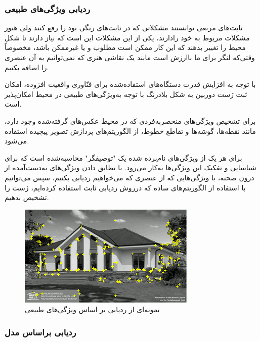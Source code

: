 	\subsubsection{ردیابی ویژگی‌های طبیعی}
	
	ثابت‌های مربعی توانستند مشکلاتی که در ثابت‌های رنگی بود را رفع کنند ولی هنوز مشکلات مربوط به خود رادارند، یکی از این مشکلات این است که نیاز دارند تا شکل محیط را تغییر بدهند که این کار ممکن است مطلوب و یا غیرممکن باشد، مخصوصاً وقتی‌که لنگر برای ما باارزش است مانند یک نقاشی هنری که نمی‌توانیم به آن عنصری را اضافه بکنیم.
	
	با توجه به افزایش قدرت دستگاه‌های استفاده‌شده برای فنّاوری واقعیت افزوده، امکان ثبت ژست دوربین به شکل بلادرنگ با توجه به‌ویژگی‌های طبیعی در محیط امکان‌پذیر است.
	
	برای تشخیص ویژگی‌های منحصربه‌فردی که در محیط عکس‌های گرفته‌شده وجود دارد، مانند نقطه‌ها، گوشه‌ها و تقاطع خطوط، از الگوریتم‌های پردازش تصویر پیچیده استفاده می‌شود.
	
	برای هر یک از ویژگی‌های نام‌برده شده یک "توصیفگر" محاسبه‌شده است که برای شناسایی و تفکیک این ویژگی‌ها به‌کار می‌رود. با تطابق دادن ویژگی‌های به‌دست‌آمده از درون صحنه، با ویژگی‌هایی که از عنصری که می‌خواهیم ردیابی بکنیم، سپس می‌توانیم با استفاده از الگوریتم‌های ساده که درروش ردیابی ثابت استفاده کرده‌ایم، ژست را تشخیص بدهیم\cite{gottl2018efficient}.
		\begin{figure}
		\centering
		\includegraphics[width=1\linewidth]{image/nft}
		\caption {نمونه‌ای از ردیابی بر اساس ویژگی‌های طبیعی   \cite{nft}}
		\label{fig:nft}
	\end{figure}
	\subsubsection{ردیابی براساس مدل}
	
